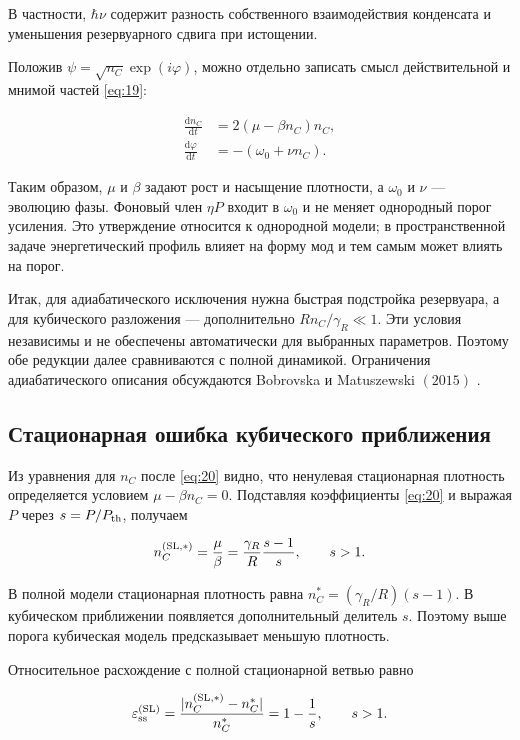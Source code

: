\documentclass[12pt,a4paper]{article}
\begin{document}
В частности, $\hbar \nu$ содержит разность собственного взаимодействия конденсата и уменьшения резервуарного сдвига при истощении.

Положив $\psi=\sqrt{n_{C}}\exp(i \varphi)$, можно отдельно записать смысл действительной и мнимой частей \eqref{eq:19}:

\[
\begin{aligned}\frac{\mathrm dn_C}{\mathrm dt}&=2(\mu-\beta n_C)n_C,\\\frac{\mathrm d\varphi}{\mathrm dt}&=-(\omega_0+\nu n_C).\end{aligned}
\]

Таким образом, $\mu$ и $\beta$ задают рост и насыщение плотности, а $\omega_{0}$ и $\nu$ --- эволюцию фазы. Фоновый член $\eta P$ входит в $\omega_{0}$ и не меняет однородный порог усиления. Это утверждение относится к однородной модели; в пространственной задаче энергетический профиль влияет на форму мод и тем самым может влиять на порог.

Итак, для адиабатического исключения нужна быстрая подстройка резервуара, а для кубического разложения --- дополнительно $R n_{C}/\gamma_{R}\ll 1$. Эти условия независимы и не обеспечены автоматически для выбранных параметров. Поэтому обе редукции далее сравниваются с полной динамикой. Ограничения адиабатического описания обсуждаются Bobrovska и Matuszewski $(2015)$ \cite{ref2}.

\subsection{Стационарная ошибка кубического приближения}\label{sec:4.4}

Из уравнения для $n_{C}$ после \eqref{eq:20} видно, что ненулевая стационарная плотность определяется условием $\mu-\beta n_{C}=0$. Подставляя коэффициенты \eqref{eq:20} и выражая $P$ через $s=P/P_{\rm th}$, получаем

\begin{equation}\label{eq:21}
n_C^{(\rm SL,*)}=\frac{\mu}{\beta}=\frac{\gamma_R}{R}\frac{s-1}{s},\qquad s>1.\end{equation}

В полной модели стационарная плотность равна $n_{C}^{*}=(\gamma_{R}/R)(s-1)$. В кубическом приближении появляется дополнительный делитель $s$. Поэтому выше порога кубическая модель предсказывает меньшую плотность.

Относительное расхождение с полной стационарной ветвью равно

\begin{equation}\label{eq:22}
\varepsilon_{\rm ss}^{(\rm SL)}=\frac{|n_C^{(\rm SL,*)}-n_C^*|}{n_C^*}=1-\frac1s,\qquad s>1.\end{equation}
\end{document}
